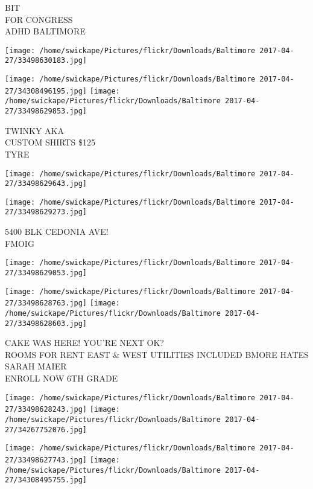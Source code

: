 \documentclass[10pt,letterpaper]{article}
\begin{document}
BIT\\
FOR CONGRESS\\
ADHD BALTIMORE\\
\pagebreak

\texttt{[image: /home/swickape/Pictures/flickr/Downloads/Baltimore 2017-04-27/33498630183.jpg]}

\vspace{0.25in}
\texttt{[image: /home/swickape/Pictures/flickr/Downloads/Baltimore 2017-04-27/34308496195.jpg]}
\texttt{[image: /home/swickape/Pictures/flickr/Downloads/Baltimore 2017-04-27/33498629853.jpg]}

TWINKY AKA\\
CUSTOM SHIRTS \$125\\
TYRE\\
\pagebreak

\texttt{[image: /home/swickape/Pictures/flickr/Downloads/Baltimore 2017-04-27/33498629643.jpg]}

\vspace{0.25in}
\texttt{[image: /home/swickape/Pictures/flickr/Downloads/Baltimore 2017-04-27/33498629273.jpg]}

5400 BLK CEDONIA AVE!\\
FMOIG\\
\pagebreak

\texttt{[image: /home/swickape/Pictures/flickr/Downloads/Baltimore 2017-04-27/33498629053.jpg]}

\vspace{0.25in}
\texttt{[image: /home/swickape/Pictures/flickr/Downloads/Baltimore 2017-04-27/33498628763.jpg]}
\texttt{[image: /home/swickape/Pictures/flickr/Downloads/Baltimore 2017-04-27/33498628603.jpg]}

CAKE WAS HERE!  YOU'RE NEXT OK?\\
ROOMS FOR RENT EAST \& WEST UTILITIES INCLUDED BMORE HATES SARAH MAIER\\
ENROLL NOW 6TH GRADE\\
\pagebreak

\texttt{[image: /home/swickape/Pictures/flickr/Downloads/Baltimore 2017-04-27/33498628243.jpg]}
\texttt{[image: /home/swickape/Pictures/flickr/Downloads/Baltimore 2017-04-27/34267752076.jpg]}

\texttt{[image: /home/swickape/Pictures/flickr/Downloads/Baltimore 2017-04-27/33498627743.jpg]}
\texttt{[image: /home/swickape/Pictures/flickr/Downloads/Baltimore 2017-04-27/34308495755.jpg]}
\end{document}
